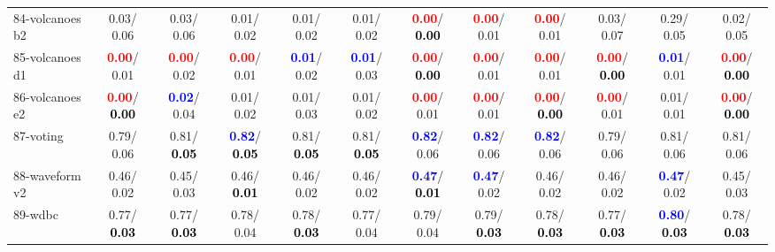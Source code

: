 \begin{table}[h]
\begin{center}
{\begin{tabular}{lc|c|c|c|c|c|c|c|c|c|c}
84-volcanoes b2 &   0.03/  0.06 &   0.03/  0.06 &   0.01/  0.02 &   0.01/  0.02 &   0.01/  0.02 & \textcolor{red}{\textbf{  0.00}}/\textcolor{black}{\textbf{  0.00}} & \textcolor{red}{\textbf{  0.00}}/  0.01 & \textcolor{red}{\textbf{  0.00}}/  0.01 &   0.03/  0.07 &   0.29/  0.05 &   0.02/  0.05 \\
85-volcanoes d1 & \textcolor{red}{\textbf{  0.00}}/  0.01 & \textcolor{red}{\textbf{  0.00}}/  0.02 & \textcolor{red}{\textbf{  0.00}}/  0.01 & \textcolor{blue}{\textbf{  0.01}}/  0.02 & \textcolor{blue}{\textbf{  0.01}}/  0.03 & \textcolor{red}{\textbf{  0.00}}/\textcolor{black}{\textbf{  0.00}} & \textcolor{red}{\textbf{  0.00}}/  0.01 & \textcolor{red}{\textbf{  0.00}}/  0.01 & \textcolor{red}{\textbf{  0.00}}/\textcolor{black}{\textbf{  0.00}} & \textcolor{blue}{\textbf{  0.01}}/  0.01 & \textcolor{red}{\textbf{  0.00}}/\textcolor{black}{\textbf{  0.00}} \\ \hline
86-volcanoes e2 & \textcolor{red}{\textbf{  0.00}}/\textcolor{black}{\textbf{  0.00}} & \textcolor{blue}{\textbf{  0.02}}/  0.04 &   0.01/  0.02 &   0.01/  0.03 &   0.01/  0.02 & \textcolor{red}{\textbf{  0.00}}/  0.01 & \textcolor{red}{\textbf{  0.00}}/  0.01 & \textcolor{red}{\textbf{  0.00}}/\textcolor{black}{\textbf{  0.00}} & \textcolor{red}{\textbf{  0.00}}/  0.01 &   0.01/  0.01 & \textcolor{red}{\textbf{  0.00}}/\textcolor{black}{\textbf{  0.00}} \\
87-voting &   0.79/  0.06 &   0.81/\textcolor{black}{\textbf{  0.05}} & \textcolor{blue}{\textbf{  0.82}}/\textcolor{black}{\textbf{  0.05}} &   0.81/\textcolor{black}{\textbf{  0.05}} &   0.81/\textcolor{black}{\textbf{  0.05}} & \textcolor{blue}{\textbf{  0.82}}/  0.06 & \textcolor{blue}{\textbf{  0.82}}/  0.06 & \textcolor{blue}{\textbf{  0.82}}/  0.06 &   0.79/  0.06 &   0.81/  0.06 &   0.81/  0.06 \\
88-waveform v2 &   0.46/  0.02 &   0.45/  0.03 &   0.46/\textcolor{black}{\textbf{  0.01}} &   0.46/  0.02 &   0.46/  0.02 & \textcolor{blue}{\textbf{  0.47}}/\textcolor{black}{\textbf{  0.01}} & \textcolor{blue}{\textbf{  0.47}}/  0.02 &   0.46/  0.02 &   0.46/  0.02 & \textcolor{blue}{\textbf{  0.47}}/  0.02 &   0.45/  0.03 \\
89-wdbc &   0.77/\textcolor{black}{\textbf{  0.03}} &   0.77/\textcolor{black}{\textbf{  0.03}} &   0.78/  0.04 &   0.78/\textcolor{black}{\textbf{  0.03}} &   0.77/  0.04 &   0.79/  0.04 &   0.79/\textcolor{black}{\textbf{  0.03}} &   0.78/\textcolor{black}{\textbf{  0.03}} &   0.77/\textcolor{black}{\textbf{  0.03}} & \textcolor{blue}{\textbf{  0.80}}/\textcolor{black}{\textbf{  0.03}} &   0.78/\textcolor{black}{\textbf{  0.03}} \\

\end{tabular}}
\end{center}
\end{table}

